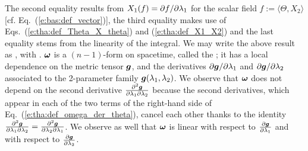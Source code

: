 The second equality results from $X_1(f) = {\partial f}/{\partial \lambda_1}$ for the scalar field
$f := \langle \Theta, X_2 \rangle$ [cf. Eq.~(\ref{e:bas:def_vector})], the third equality
makes use of Eqs.~(\ref{e:tha:def_Theta_X_theta}) and (\ref{e:tha:def_X1_X2})
and the last equality stems from the linearity of the integral.
We may write the above result as
\be \label{e:tha:Omega_int_omega}
     ,
\ee
with
\be \label{e:tha:def_omega_der_theta}
  .
\ee
$\bm{\omega}$ is a $(n-1)$-form on spacetime, called the
 \cite{WaldZ00};
it has a local dependence on the metric tensor $\bm{g}$,
and the derivatives ${\partial \bm{g}}/{\partial \lambda_1}$ and ${\partial \bm{g}}/{\partial \lambda_2}$
associated to the 2-parameter family $\bm{g}(\lambda_1,\lambda_2)$. We observe
that $\bm{\omega}$ does not depend on the second derivative
$\frac{\partial^2\bm{g}}{\partial\lambda_1\partial\lambda_2}$ because the second derivatives,
which appear in each of the two terms of the right-hand side of
Eq.~(\ref{e:tha:def_omega_der_theta}), cancel each other thanks to the
identity
$\frac{\partial^2\bm{g}}{\partial\lambda_1\partial\lambda_2} = \frac{\partial^2\bm{g}}{\partial\lambda_2\partial\lambda_1}$.
We observe as well that $\bm{\omega}$ is linear with respect to $\frac{\partial \bm{g}}{\partial \lambda_1}$
and with respect to $\frac{\partial \bm{g}}{\partial \lambda_2}$.

